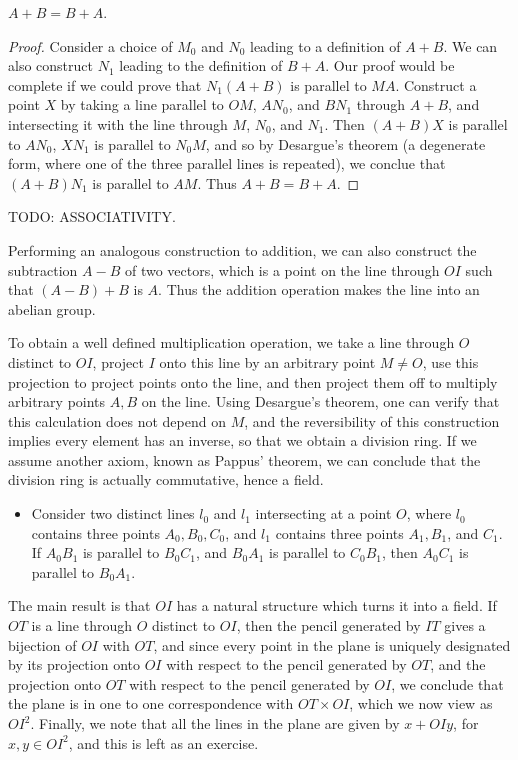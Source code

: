 \begin{theorem}
    $A+B = B+A$.
\end{theorem}
\begin{proof}
    Consider a choice of $M_0$ and $N_0$ leading to a definition of $A+B$. We can also construct $N_1$ leading to the definition of $B+A$. Our proof would be complete if we could prove that $N_1(A+B)$ is parallel to $MA$. Construct a point $X$ by taking a line parallel to $OM$, $AN_0$, and $BN_1$ through $A+B$, and intersecting it with the line through $M$, $N_0$, and $N_1$. Then $(A+B)X$ is parallel to $AN_0$, $XN_1$ is parallel to $N_0M$, and so by Desargue's theorem (a degenerate form, where one of the three parallel lines is repeated), we conclue that $(A+B)N_1$ is parallel to $AM$. Thus $A+B = B+A$.
\end{proof}

TODO: ASSOCIATIVITY.

Performing an analogous construction to addition, we can also construct the subtraction $A - B$ of two vectors, which is a point on the line through $OI$ such that $(A - B) + B$ is $A$. Thus the addition operation makes the line into an abelian group.

To obtain a well defined multiplication operation, we take a line through $O$ distinct to $OI$, project $I$ onto this line by an arbitrary point $M \neq O$, use this projection to project points onto the line, and then project them off to multiply arbitrary points $A,B$ on the line. Using Desargue's theorem, one can verify that this calculation does not depend on $M$, and the reversibility of this construction implies every element has an inverse, so that we obtain a division ring. If we assume another axiom, known as Pappus' theorem, we can conclude that the division ring is actually commutative, hence a field.
%
\begin{itemize}
    \item Consider two distinct lines $l_0$ and $l_1$ intersecting at a point $O$, where $l_0$ contains three points $A_0,B_0,C_0$, and $l_1$ contains three points $A_1,B_1$, and $C_1$. If $A_0B_1$ is parallel to $B_0C_1$, and $B_0A_1$ is parallel to $C_0B_1$, then $A_0C_1$ is parallel to $B_0A_1$.
\end{itemize}
%
The main result is that $OI$ has a natural structure which turns it into a field. If $OT$ is a line through $O$ distinct to $OI$, then the pencil generated by $IT$ gives a bijection of $OI$ with $OT$, and since every point in the plane is uniquely designated by its projection onto $OI$ with respect to the pencil generated by $OT$, and the projection onto $OT$ with respect to the pencil generated by $OI$, we conclude that the plane is in one to one correspondence with $OT \times OI$, which we now view as $OI^2$. Finally, we note that all the lines in the plane are given by $x + OIy$, for $x,y \in OI^2$, and this is left as an exercise. 


